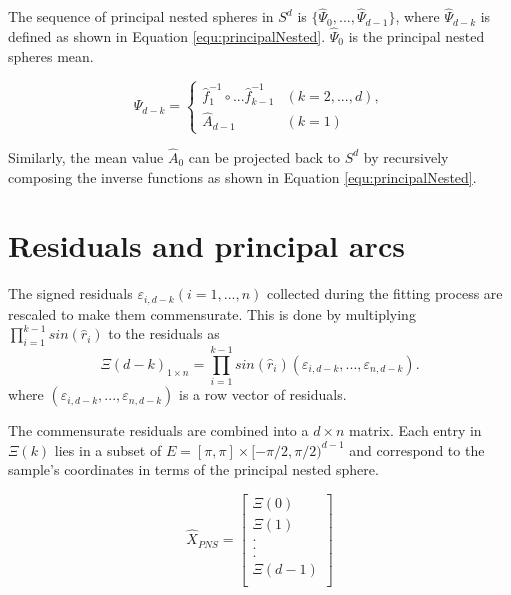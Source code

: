 The sequence of principal nested spheres in $S^d$ is $\{ \hat \varPsi_0, ..., \hat \varPsi_{d-1}\}$,
where $\hat \varPsi_{d - k}$ is defined as shown in Equation \ref{equ:principalNested}.
$\hat \varPsi_0$ is the principal nested spheres mean.

\begin{equation}
 \varPsi_{d - k} = \left\{ \begin{array}{ll}
                              \hat f_1^{-1} \circ ... \hat f_{k - 1}^{-1} &	(k = 2, ..., d), \\
                              \hat A_{d - 1}  & (k = 1) \end{array} \right.
 \label{equ:principalNested}
\end{equation}

Similarly,
the mean value $\hat A_0$ can be projected back to $S^d$ 
by recursively composing the inverse functions
as shown in Equation \ref{equ:principalNested}.


\section{Residuals and principal arcs}

The signed residuals $\varepsilon_{i, d - k} (i = 1, ..., n)$ collected during the fitting process
are rescaled to make them commensurate. 
This is done by multiplying $\prod_{i = 1}^{k - 1} sin(\hat r_i)$ 
to the residuals as
\begin{equation}
 \Xi(d - k)_{1 \times n} = \prod_{i = 1}^{k - 1} sin(\hat r_i) (\varepsilon_{i, d - k}, ..., \varepsilon_{n, d - k}).
 \label{equ:commensurateResiduals}
\end{equation}
where $(\varepsilon_{i, d - k}, ..., \varepsilon_{n, d - k})$ is a row vector of residuals. 

The commensurate residuals are combined into a $d \times n$ matrix.
Each entry in $\Xi(k)$ lies in a subset of $E = [ \pi, \pi] \times [-\pi/2, \pi/2)^{d-1}$
and correspond to the sample's coordinates in terms of the principal nested sphere.

\begin{equation}
  \hat X_{PNS} = \left [ \begin{array}{c}
                          \Xi(0) \\
                          \Xi(1) \\
                          . \\
                          . \\
                          . \\
                          \Xi(d-1) \\
                         \end{array} \right ]
 \label{equ:principalResiduals}
\end{equation}

